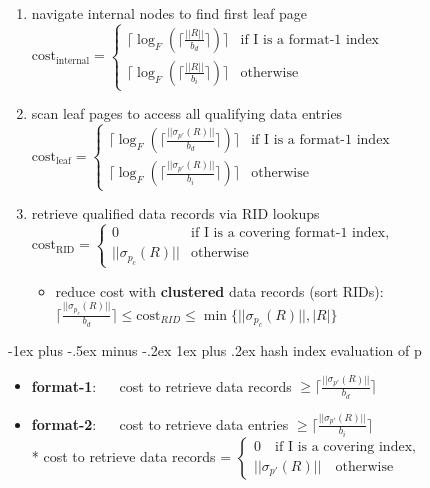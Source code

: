 \documentclass[10pt, landscape]{article}
\makeatletter
\renewcommand{\subsubsection}{\@startsection{subsubsection}{3}{0mm}%
  {-1ex plus -.5ex minus -.2ex}%
  {1ex plus .2ex}%
{\normalfont\small\bfseries}}%
\makeatother
\begin{document}
\begin{multicols*}{4}
  \begin{enumerate}
    \item navigate internal nodes to find first leaf page
      \( {\displaystyle{ 
          \text{cost}_{\text{internal}}=
          \begin{cases}
            \lceil \log_F ( \lceil \frac{||R||}{b_d} \rceil )\rceil &\text{if $$I$$ is a format-1 index}\\
            \lceil \log_F ( \lceil 
            \frac{||R||}{b_i} \rceil )\rceil  &\text{otherwise}
          \end{cases}
      }} \) 
    \item scan leaf pages to access all qualifying data entries
      \( {\displaystyle{ 
          \text{cost}_{\text{leaf}}=
          \begin{cases}
            \lceil \log_F ( \lceil \frac{||\sigma_{p'}(R)||}{b_d} \rceil )\rceil &\text{if $$I$$ is a format-1 index}\\
            \lceil \log_F ( \lceil 
            \frac{||\sigma_{p'}(R)||}{b_i} \rceil )\rceil  &\text{otherwise}
          \end{cases}
      }} \) 
    \item retrieve qualified data records via RID lookups
      \( {\displaystyle{ 
          \text{cost}_{\text{RID}}=
          \begin{cases}
            0 &\text{if $$I$$ is a covering format-1 index,}\\
            ||\sigma_{p_c}(R)||  &\text{otherwise}
          \end{cases}
      }} \) 
      \begin{itemize}
        \item reduce cost with \textbf{clustered} data records (sort RIDs): 
          $\lceil\frac{||\sigma_{p_c}(R)||}{b_d}\rceil \leq \text{cost}_{RID} \leq \min\{||\sigma_{p_c}(R)||, |R|\}$
      \end{itemize}
  \end{enumerate}

  \subsubsection{hash index evaluation of p}

  \begin{itemize}
    \item \textbf{format-1}: $\quad$ cost to retrieve data records $ \geq \lceil\frac{||\sigma_{p'}(R)||}{b_d}\rceil $
    \item \textbf{format-2}: $\quad$ cost to retrieve data entries $ \geq \lceil\frac{||\sigma_{p'}(R)||}{b_i}\rceil $ 
      \\* cost to retrieve data records = $ \begin{cases} 0 \quad \text{if $$I$$ is a covering index,}\\
        ||\sigma_{p'}(R)||  \quad \text{otherwise}
      \end{cases} $
  \end{itemize}



\end{multicols*}
\end{document}
